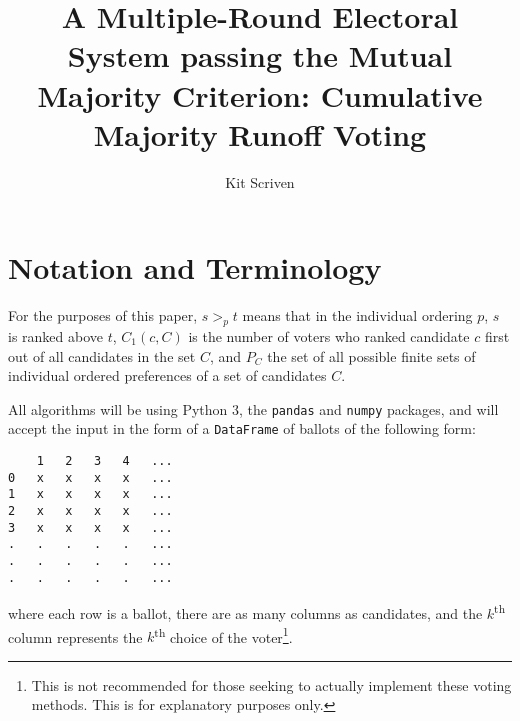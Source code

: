 \documentclass{article}
\author{Kit Scriven}
\title{A Multiple-Round Electoral System passing the Mutual Majority Criterion: Cumulative Majority Runoff Voting}
\newcommand{\super}{\textsuperscript}
\begin{document}
\maketitle
\section{Notation and Terminology}
For the purposes of this paper, $s >_p t$ means that in the individual ordering $p$, $s$ is ranked above $t$, $C_1(c, C)$ is the number of voters who ranked candidate $c$ first out of all candidates in the set $C$, and $P_C$ the set of all possible finite sets of individual ordered preferences of a set of candidates $C$.

All algorithms will be using Python 3, the \texttt{pandas} and \texttt{numpy} packages, and will accept the input in the form of a \texttt{DataFrame} of ballots of the following form:
\begin{lstlisting}
	1	2	3	4	...
0	x	x	x	x	...
1	x	x	x	x	...
2	x	x	x	x	...
3	x	x	x	x	...
.	.	.	.	.	...
.	.	.	.	.	...
.	.	.	.	.	...
\end{lstlisting}
where each row is a ballot, there are as many columns as candidates, and the $k$\super{th} column represents the $k$\super{th} choice of the voter\footnote{This is not recommended for those seeking to actually implement these voting methods. This is for explanatory purposes only.}.
\end{document}
